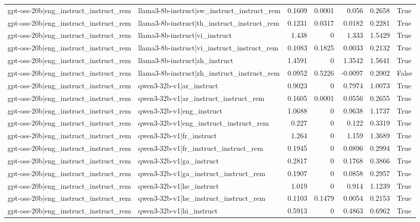 \begin{table}
\begin{tabular}{l l r r r r l}
gpt-oss-20b|eng_instruct_instruct_rem & llama3-8b-instruct|sw_instruct_instruct_rem & 0.1609 & 0.0001 & 0.056 & 0.2658 & True \\
gpt-oss-20b|eng_instruct_instruct_rem & llama3-8b-instruct|th_instruct_instruct_rem & 0.1231 & 0.0317 & 0.0182 & 0.2281 & True \\
gpt-oss-20b|eng_instruct_instruct_rem & llama3-8b-instruct|vi_instruct & 1.438 & 0 & 1.333 & 1.5429 & True \\
gpt-oss-20b|eng_instruct_instruct_rem & llama3-8b-instruct|vi_instruct_instruct_rem & 0.1083 & 0.1825 & 0.0033 & 0.2132 & True \\
gpt-oss-20b|eng_instruct_instruct_rem & llama3-8b-instruct|zh_instruct & 1.4591 & 0 & 1.3542 & 1.5641 & True \\
gpt-oss-20b|eng_instruct_instruct_rem & llama3-8b-instruct|zh_instruct_instruct_rem & 0.0952 & 0.5226 & -0.0097 & 0.2002 & False \\
gpt-oss-20b|eng_instruct_instruct_rem & qwen3-32b-v1|ar_instruct & 0.9023 & 0 & 0.7974 & 1.0073 & True \\
gpt-oss-20b|eng_instruct_instruct_rem & qwen3-32b-v1|ar_instruct_instruct_rem & 0.1605 & 0.0001 & 0.0556 & 0.2655 & True \\
gpt-oss-20b|eng_instruct_instruct_rem & qwen3-32b-v1|eng_instruct & 1.0688 & 0 & 0.9638 & 1.1737 & True \\
gpt-oss-20b|eng_instruct_instruct_rem & qwen3-32b-v1|eng_instruct_instruct_rem & 0.227 & 0 & 0.122 & 0.3319 & True \\
gpt-oss-20b|eng_instruct_instruct_rem & qwen3-32b-v1|fr_instruct & 1.264 & 0 & 1.159 & 1.3689 & True \\
gpt-oss-20b|eng_instruct_instruct_rem & qwen3-32b-v1|fr_instruct_instruct_rem & 0.1945 & 0 & 0.0896 & 0.2994 & True \\
gpt-oss-20b|eng_instruct_instruct_rem & qwen3-32b-v1|ga_instruct & 0.2817 & 0 & 0.1768 & 0.3866 & True \\
gpt-oss-20b|eng_instruct_instruct_rem & qwen3-32b-v1|ga_instruct_instruct_rem & 0.1907 & 0 & 0.0858 & 0.2957 & True \\
gpt-oss-20b|eng_instruct_instruct_rem & qwen3-32b-v1|he_instruct & 1.019 & 0 & 0.914 & 1.1239 & True \\
gpt-oss-20b|eng_instruct_instruct_rem & qwen3-32b-v1|he_instruct_instruct_rem & 0.1103 & 0.1479 & 0.0054 & 0.2153 & True \\
gpt-oss-20b|eng_instruct_instruct_rem & qwen3-32b-v1|hi_instruct & 0.5913 & 0 & 0.4863 & 0.6962 & True \\

\end{tabular}
\end{table}
